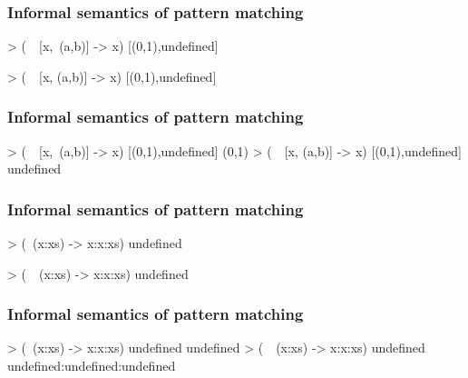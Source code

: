 \documentclass{beamer}
\begin{document}
\begin{frame}[fragile]
  \frametitle{Informal semantics of pattern matching}

  \begin{example}
    \begin{code}
> (\ ~[x,~(a,b)] -> x) [(0,1),undefined]

> (\ ~[x, (a,b)] -> x) [(0,1),undefined]

    \end{code}
  \end{example}
\end{frame}

\begin{frame}[fragile]
  \frametitle{Informal semantics of pattern matching}

  \begin{example}
    \begin{code}
> (\ ~[x,~(a,b)] -> x) [(0,1),undefined]
(0,1)
> (\ ~[x, (a,b)] -> x) [(0,1),undefined]
undefined
    \end{code}
  \end{example}
\end{frame}


\begin{frame}[fragile]
  \frametitle{Informal semantics of pattern matching}

  \begin{example}
    \begin{code}
> (\  (x:xs) -> x:x:xs) undefined

> (\ ~(x:xs) -> x:x:xs) undefined

    \end{code}
  \end{example}
\end{frame}

\begin{frame}[fragile]
  \frametitle{Informal semantics of pattern matching}

  \begin{example}
    \begin{code}
> (\  (x:xs) -> x:x:xs) undefined
undefined
> (\ ~(x:xs) -> x:x:xs) undefined
undefined:undefined:undefined
    \end{code}
  \end{example}
\end{frame}

\end{document}
